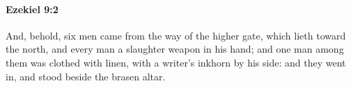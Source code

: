 
		\paragraph{Ezekiel 9:2} %
			\label{EZEKIEL-9-2}

			And, behold, six men came from the way of the higher gate, which lieth toward the north, and every man a slaughter weapon in his hand; and one man among them was clothed with linen, with a writer’s inkhorn by his side: and they went in, and stood beside the brasen altar.



